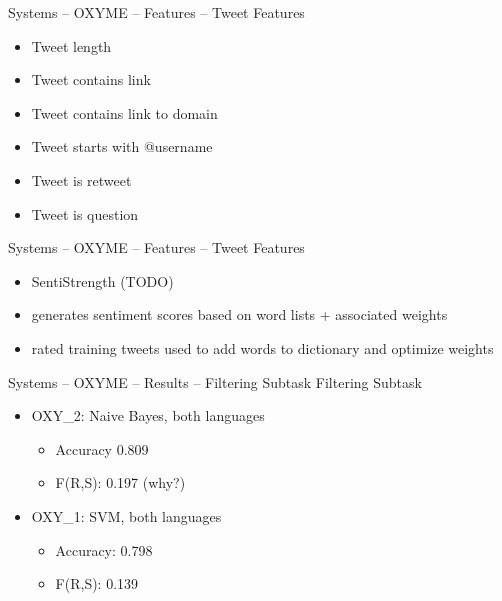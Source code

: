 \documentclass[12pt,a4paper]{beamer}
\begin{document}
\begin{frame}{Systems -- OXYME -- Features -- Tweet Features}
\begin{itemize}
\item Tweet length
\item Tweet contains link
\item Tweet contains link to domain
\item Tweet starts with @username
\item Tweet is retweet
\item Tweet is question
\end{itemize}

\end{frame}


\begin{frame}{Systems -- OXYME -- Features -- Tweet Features}
\begin{itemize}
\item SentiStrength (TODO)
\item generates sentiment scores based on word lists + associated weights
\item rated training tweets used to add words to dictionary and optimize weights
\end{itemize}

\end{frame}

\begin{frame}{Systems -- OXYME -- Results -- Filtering Subtask}
Filtering Subtask
\begin{itemize}
\item OXY\_2: Naive Bayes, both languages
  \begin{itemize}
  \item Accuracy 0.809
  \item F(R,S): 0.197 (why?)
  \end{itemize}
\item OXY\_1: SVM, both languages
  \begin{itemize}
  \item Accuracy: 0.798
  \item F(R,S): 0.139
  \end{itemize}
\end{itemize}

\end{frame}
\end{document}

